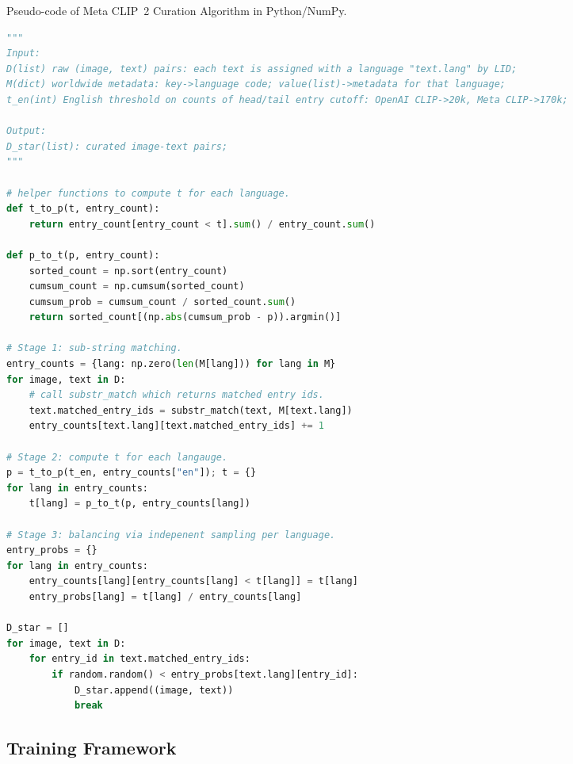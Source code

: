 \begin{algorithm}[ht]
\caption{Pseudo-code of Meta CLIP~2 Curation Algorithm in Python/NumPy.}
\label{alg:code}
\centering
\begin{lstlisting}[language=python]
"""
Input: 
D(list) raw (image, text) pairs: each text is assigned with a language "text.lang" by LID;
M(dict) worldwide metadata: key->language code; value(list)->metadata for that language;
t_en(int) English threshold on counts of head/tail entry cutoff: OpenAI CLIP->20k, Meta CLIP->170k;

Output: 
D_star(list): curated image-text pairs;
"""

# helper functions to compute t for each language.
def t_to_p(t, entry_count):
    return entry_count[entry_count < t].sum() / entry_count.sum()

def p_to_t(p, entry_count):
    sorted_count = np.sort(entry_count)
    cumsum_count = np.cumsum(sorted_count)
    cumsum_prob = cumsum_count / sorted_count.sum()
    return sorted_count[(np.abs(cumsum_prob - p)).argmin()]

# Stage 1: sub-string matching.
entry_counts = {lang: np.zero(len(M[lang])) for lang in M}
for image, text in D:
    # call substr_match which returns matched entry ids.
    text.matched_entry_ids = substr_match(text, M[text.lang])
    entry_counts[text.lang][text.matched_entry_ids] += 1

# Stage 2: compute t for each langauge.
p = t_to_p(t_en, entry_counts["en"]); t = {}
for lang in entry_counts:
    t[lang] = p_to_t(p, entry_counts[lang])

# Stage 3: balancing via indepenent sampling per language.
entry_probs = {}
for lang in entry_counts:
    entry_counts[lang][entry_counts[lang] < t[lang]] = t[lang]
    entry_probs[lang] = t[lang] / entry_counts[lang]

D_star = []
for image, text in D:
    for entry_id in text.matched_entry_ids:
        if random.random() < entry_probs[text.lang][entry_id]:
            D_star.append((image, text))
            break
\end{lstlisting}
\end{algorithm}

\subsection{Training Framework}
\label{sec:scaling_recipe}

